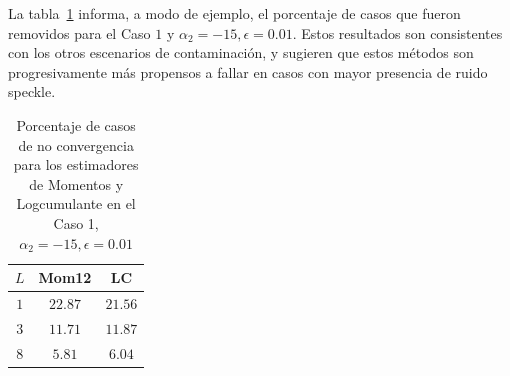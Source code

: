 La tabla~\ref{tabla_removidos} informa, a modo de ejemplo, el porcentaje de casos que fueron removidos para el Caso $1$ y $\alpha_2 = -15, \epsilon = 0.01$. Estos resultados son consistentes con los otros escenarios de contaminación, y sugieren que estos métodos son progresivamente más propensos a fallar en casos con mayor presencia de ruido speckle.

\begin{table}[hbt]
	\centering
	\begin{tabular}{ccc}
		\toprule
		$L$ & Mom12  & LC \\
		\midrule
		$1$ & $22.87$  & $21.56$ \\
		$3$ & $11.71$  &  $11.87$ \\
		$8$ & $5.81$ & $6.04$  \\
		\bottomrule
	\end{tabular}
\caption{\label{tabla_removidos}Porcentaje de casos de no convergencia para los estimadores de Momentos y  Logcumulante en el Caso 1, $\alpha_2 = -15, \epsilon = 0.01$}
\end{table}



